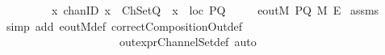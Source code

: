 \begin{isabellebody}
\ \ \ \ \ \ \ \ {\isachardoublequoteopen}{\isasymforall}\ {\isacharparenleft}x\ {\isacharcolon}{\isacharcolon}chanID{\isacharparenright}{\isachardot}\ {\isacharparenleft}{\isacharparenleft}x\ {\isasymin}\ ChSetQ{\isacharparenright}\ {\isasymlongrightarrow}\ {\isacharparenleft}x\ {\isasymin}\ {\isacharparenleft}loc\ PQ{\isacharparenright}{\isacharparenright}{\isacharparenright}{\isachardoublequoteclose}\isanewline
{}\ \ \ \ {\isachardoublequoteopen}{\isasymnot}\ eoutM\ PQ\ M\ E{\isachardoublequoteclose}\isanewline
%
\isadelimproof
%
\endisadelimproof
%
\isatagproof
{}\isamarkupfalse%
\ assms\ \isanewline
{}\isamarkupfalse%
\ {\isacharparenleft}simp\ add{\isacharcolon}\ eoutM{\isacharunderscore}def\ correctCompositionOut{\isacharunderscore}def\ \isanewline
\ \ \ \ \ \ \ \ \ \ \ \ \ \ \ \ \ \ \ \ \ out{\isacharunderscore}exprChannelSet{\isacharunderscore}def{\isacharcomma}\ auto{\isacharparenright}%
\endisatagproof
{\isafoldproof}%
%
\isadelimproof
\ \isanewline
%
\endisadelimproof
%
\isadelimtheory
\isanewline
%
\endisadelimtheory
%
\isatagtheory
{}\isamarkupfalse%
%
\endisatagtheory
{\isafoldtheory}%
%
\isadelimtheory
%
\endisadelimtheory
\ \end{isabellebody}%
